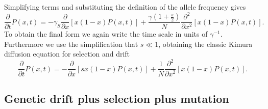 Simplifying terms and substituting the definition of the allele frequency gives
\begin{equation}
    \frac{\partial}{\partial t} P(x, t) =
    -\gamma_{S} \frac{\partial}{\partial x}[x(1-x) P(x, t)] 
    +\frac{\gamma\left(1+\frac{s}{2}\right)}{N}
    \frac{\partial^{2}}{\partial x^{2}}[x(1-x) P(x, t)].
\end{equation}
To obtain the final form we again write the time scale in units of
$\gamma^{-1}$. Furthermore we use the simplification that $s \ll 1$, obtaining
the classic Kimura diffusion equation for selection and drift
\begin{equation}
    \frac{\partial}{\partial t} P(x, t) =
    -\frac{\partial}{\partial x}[s x(1-x) P(x, t)] 
    +\frac{1}{N} \frac{\partial^{2}}{\partial x^{2}}[x(1-x) P(x, t)].
\end{equation}

\subsection{Genetic drift plus selection plus mutation}

